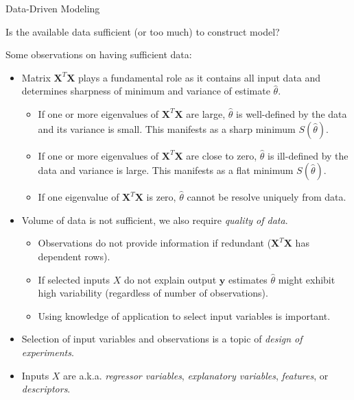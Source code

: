 \documentclass[9pt]{beamer}
\begin{document}
%
\begin{frame}{Data-Driven Modeling}

\begin{block}{}
Is the available data sufficient (or too much) to construct model?
\end{block}
Some observations on having sufficient data:
\begin{itemize}
\item Matrix $\mathbf{X}^T\mathbf{X}$ plays a fundamental role as it contains all input data and determines  sharpness of minimum and variance of estimate $\hat{\theta}$. 
\begin{itemize}
\item If one or more eigenvalues of $\mathbf{X}^T\mathbf{X}$ are large, $\hat{\theta}$ is well-defined by the data and its variance is small.  This manifests as a sharp minimum $S(\hat{\theta})$. 
\item If one or more eigenvalues of $\mathbf{X}^T\mathbf{X}$ are close to zero, $\hat{\theta}$ is ill-defined by the data and variance is large. This manifests as a flat minimum $S(\hat{\theta})$. 
\item If one eigenvalue of $\mathbf{X}^T\mathbf{X}$ is zero, $\hat{\theta}$ cannot be resolve uniquely from data.  
\end{itemize}
\item Volume of data is not sufficient, we also require {\em quality of data}. 
\begin{itemize}
\item Observations do not provide information if redundant ($\mathbf{X}^T\mathbf{X}$ has dependent rows). 
\item If selected inputs $X$ do not explain output $\mathbf{y}$ estimates $\hat{\theta}$ might exhibit high variability (regardless of number of observations). 
\item Using knowledge of application to select input variables is important.  
\end{itemize}
\item Selection of input variables and observations is a topic of {\em design of experiments}. 
\item Inputs $X$ are a.k.a. {\em regressor variables}, {\em explanatory variables}, {\em features}, or {\em descriptors}. 
\end{itemize}

\end{frame}
\end{document}
